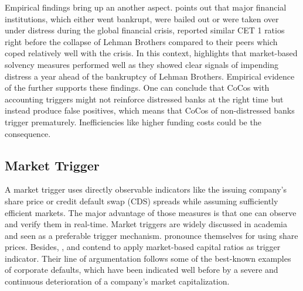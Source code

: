 Empirical findings bring up an another aspect. \citet{haldane2011capital} points out that major financial institutions, which either went bankrupt, were bailed out or were taken over under distress during the global financial crisis, reported similar CET 1 ratios right before the collapse of Lehman Brothers compared to their peers which coped relatively well with the crisis. In this context, \citet{haldane2011capital} highlights that market-based solvency measures performed well as they showed clear signals of impending distress a year ahead of the bankruptcy of Lehman Brothers. Empirical evidence of the  further supports these findings. One can conclude that CoCos with accounting triggers might not reinforce distressed banks at the right time but instead produce false positives, which means that CoCos of non-distressed banks trigger prematurely. Inefficiencies like higher funding costs could be the consequence. \citep{pazarbasioglu2011contingent}

\subsection{Market Trigger} \label{markettrigger}

A market trigger uses directly observable indicators like the issuing company's share price or credit default swap (CDS) spreads while assuming sufficiently efficient markets. The major advantage of those measures is that one can observe and verify them in real-time. \citep{haldane2011capital} Market triggers are widely discussed in academia and seen as a preferable trigger mechanism. \citet{calomiris2013design} pronounce themselves for using share prices. Besides, \citet{haldane2011capital}, \citet{pazarbasioglu2011contingent} and \citep{calomiris2013design} contend to apply market-based capital ratios as trigger indicator. Their line of argumentation follows some of the best-known examples of corporate defaults, which have been indicated well before by a severe and continuous deterioration of a company's market capitalization.\\ 

